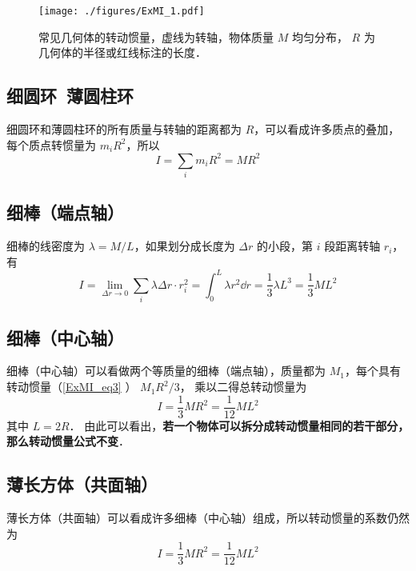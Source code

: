 

\begin{figure}[ht]
\centering
\texttt{[image: ./figures/ExMI\_1.pdf]}
\caption{常见几何体的转动惯量，虚线为转轴，物体质量 $M$ 均匀分布， $R$ 为几何体的半径或红线标注的长度．}\label{ExMI_fig1}
\end{figure}

\subsection{细圆环\ 薄圆柱环}
细圆环和薄圆柱环的所有质量与转轴的距离都为 $R$，可以看成许多质点的叠加，每个质点转惯量为 $m_i R^2$，所以
\begin{equation}\label{ExMI_eq4}
I = \sum_i m_i R^2 = M R^2
\end{equation}

\subsection{ 细棒（端点轴）}
细棒的线密度为 $\lambda  = M/L$，如果划分成长度为 $\Delta r$ 的小段，第 $i$ 段距离转轴 $r_i$， 有
\begin{equation}\label{ExMI_eq3}
I = \lim_{\Delta r \to 0}\sum_i \lambda\Delta r \cdot r_i^2 =  \int_0^L \lambda r^2 \dd{r} = \frac{1}{3}\lambda L^3 = \frac{1}{3}M L^2
\end{equation}

\subsection{细棒（中心轴）}
细棒（中心轴）可以看做两个等质量的细棒（端点轴），质量都为 $M_1$，每个具有转动惯量（\autoref{ExMI_eq3} ） $M_1 R^2/3$， 乘以二得总转动惯量为
\begin{equation}\label{ExMI_eq2}
I = \frac{1}{3} MR^2 = \frac{1}{12}ML^2
\end{equation}
其中 $L=2R$． 由此可以看出，\textbf{若一个物体可以拆分成转动惯量相同的若干部分，那么转动惯量公式不变}．

\subsection{薄长方体（共面轴）}
\label{ExMI_eq5}\label{ExMI_eq6}\label{ExMI_eq7}薄长方体（共面轴）可以看成许多细棒（中心轴）组成，所以转动惯量的系数仍然为
\begin{equation}
I = \frac{1}{3} MR^2 = \frac{1}{12}ML^2
\end{equation}

